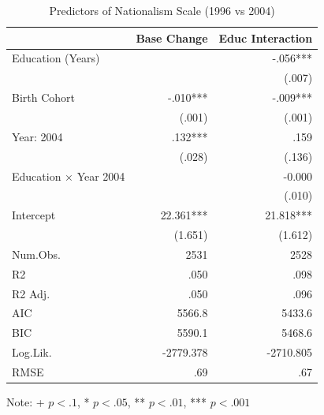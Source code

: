 \begin{table}[htbp]
\centering
\begin{threeparttable}
\caption{Predictors of Nationalism Scale (1996 vs 2004)}
\label{tab:nationalism}
\small
\begin{tabular}{lrr}
\toprule
& Base Change & Educ Interaction \\
\midrule
Education (Years) &  & -.056*** \\
&  & (.007) \\
Birth Cohort & -.010*** & -.009*** \\
& (.001) & (.001) \\
Year: 2004 & .132*** & .159 \\
& (.028) & (.136) \\
Education × Year 2004 &  & -0.000 \\
&  & (.010) \\
Intercept & 22.361*** & 21.818*** \\
& (1.651) & (1.612) \\
Num.Obs. & 2531 & 2528 \\
R2 & .050 & .098 \\
R2 Adj. & .050 & .096 \\
AIC & 5566.8 & 5433.6 \\
BIC & 5590.1 & 5468.6 \\
Log.Lik. & -2779.378 & -2710.805 \\
RMSE & .69 & .67 \\
\bottomrule
\end{tabular}
\begin{tablenotes}
\small
Note: + $p < .1$, * $p < .05$, ** $p < .01$, *** $p < .001$
\end{tablenotes}
\end{threeparttable}
\end{table}
